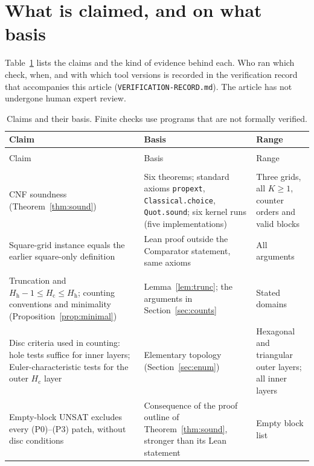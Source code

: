 \documentclass[10pt,a4paper]{article}
\theoremstyle{definition}
\theoremstyle{remark}
\newcommand{\Hc}{H_{\mathrm c}}
\newcommand{\Hh}{H_{\mathrm h}}
\newcommand{\lean}[1]{\texttt{#1}}
\begin{document}
\section{What is claimed, and on what basis}
\label{sec:status}
Table~\ref{tab:status} lists the claims and the kind of evidence behind
each. Who ran which check, when, and with which tool versions is recorded
in the verification record that accompanies this article
(\mbox{\texttt{VERIFICATION-RECORD.md}}). The article has not undergone
human expert review.

{\small
\begin{longtable}{@{}>{\raggedright\arraybackslash}p{.34\linewidth}
>{\raggedright\arraybackslash}p{.41\linewidth}
>{\raggedright\arraybackslash}p{.19\linewidth}@{}}
\caption{Claims and their basis. Finite checks use programs that are not
formally verified.}\label{tab:status}\\
\toprule
Claim & Basis & Range\\
\midrule
\endfirsthead
\multicolumn{3}{@{}l}{\textit{Table~\thetable\ continued}}\\
\toprule Claim & Basis & Range\\\midrule
\endhead
\bottomrule\endfoot
\multicolumn{3}{@{}l}{\emph{Lean proof}}\\
CNF soundness (Theorem~\ref{thm:sound}) & Six theorems; standard axioms
\lean{propext}, \lean{Classical.choice}, \lean{Quot.sound}; six kernel
runs (five implementations) & Three grids, all $K\geq1$, counter orders
and valid blocks\\
Square-grid instance equals the earlier square-only definition & Lean
proof outside the Comparator statement, same axioms & All arguments\\
\midrule
\multicolumn{3}{@{}l}{\emph{Prose}}\\
Truncation and $\Hh-1\leq\Hc\leq\Hh$; counting conventions and
minimality (Proposition~\ref{prop:minimal}) &
Lemma~\ref{lem:trunc}; the arguments in Section~\ref{sec:counts} &
Stated domains\\
Disc criteria used in counting: hole tests suffice for inner layers;
Euler-characteristic tests for the outer $\Hc$ layer &
Elementary topology (Section~\ref{sec:enum}) & Hexagonal and triangular
outer layers; all inner layers\\
Empty-block UNSAT excludes every (P0)--(P3) patch, without disc conditions &
Consequence of the proof outline of Theorem~\ref{thm:sound}, stronger than
its Lean statement & Empty block list\\
\midrule

\end{longtable}}
\end{document}
